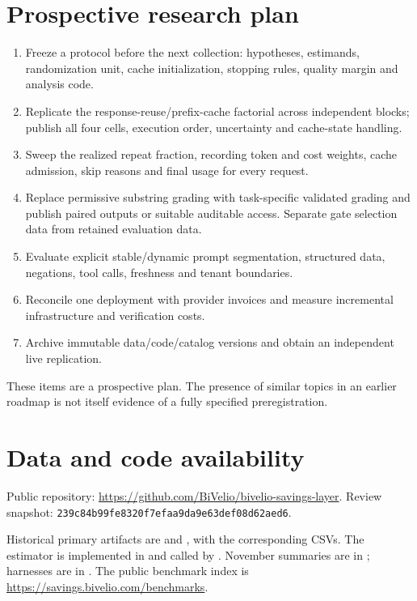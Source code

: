 \documentclass[11pt,a4paper]{article}
\begin{document}
\section{Prospective research plan}\label{sec:plan}
\begin{enumerate}[leftmargin=1.6em]
  \item Freeze a protocol before the next collection: hypotheses, estimands, randomization unit,
  cache initialization, stopping rules, quality margin and analysis code.
  \item Replicate the response-reuse/prefix-cache factorial across independent blocks; publish
  all four cells, execution order, uncertainty and cache-state handling.
  \item Sweep the realized repeat fraction, recording token and cost weights, cache admission,
  skip reasons and final usage for every request.
  \item Replace permissive substring grading with task-specific validated grading and publish
  paired outputs or suitable auditable access. Separate gate selection data from retained
  evaluation data.
  \item Evaluate explicit stable/dynamic prompt segmentation, structured data, negations, tool
  calls, freshness and tenant boundaries.
  \item Reconcile one deployment with provider invoices and measure incremental infrastructure
  and verification costs.
  \item Archive immutable data/code/catalog versions and obtain an independent live replication.
\end{enumerate}
These items are a prospective plan. The presence of similar topics in an earlier roadmap is not
itself evidence of a fully specified preregistration.

\section{Data and code availability}\label{sec:datos}
Public repository: \url{https://github.com/BiVelio/bivelio-savings-layer}. Review snapshot:
\texttt{239c84b99fe8320f7efaa9da9e63def08d62aed6}.

Historical primary artifacts are  and
, with the corresponding CSVs. The
estimator is implemented in  and called by
. November summaries are in
; harnesses are in . The public
benchmark index is \url{https://savings.bivelio.com/benchmarks}.
\end{document}
